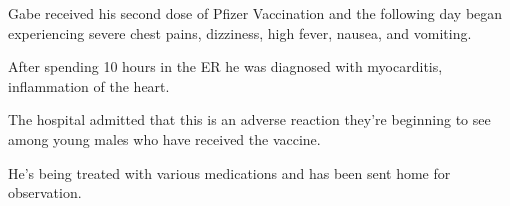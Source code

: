 Gabe received his second dose of Pfizer Vaccination and the following day began
experiencing severe chest pains, dizziness, high fever, nausea, and vomiting.

After spending 10 hours in the ER he was diagnosed with myocarditis,
inflammation of the heart.

The hospital admitted that this is an adverse reaction they’re beginning to see
among young males who have received the vaccine.

He’s being treated with various medications and has been sent home for
observation.

